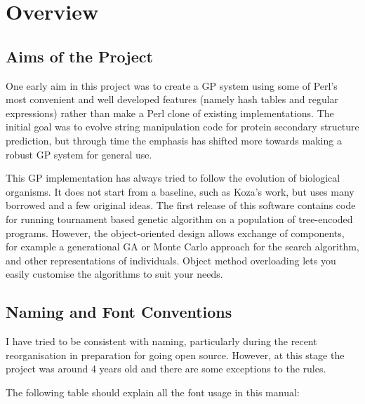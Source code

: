 \documentclass[a4paper]{article}
\begin{document}
\section{Overview}
\subsection{Aims of the Project}
One early aim in this project was to create a GP system using some of
Perl's most convenient and well developed features (namely hash tables
and regular expressions) rather than make a Perl clone of existing
implementations.  The initial goal was to evolve string manipulation
code for protein secondary structure prediction, but through time the
emphasis has shifted more towards making a robust GP system for
general use.

This GP implementation has always tried to follow the evolution of
biological organisms.  It does not start from a baseline, such as
Koza's work, but uses many borrowed and a few original ideas.  The
first release of this software contains code for running tournament
based genetic algorithm on a population of tree-encoded programs.
However, the object-oriented design allows exchange of components, for
example a generational GA or Monte Carlo approach for the search
algorithm, and other representations of individuals.  Object method
overloading lets you easily customise the algorithms to suit your
needs.

\subsection{Naming and Font Conventions}

I have tried to be consistent with naming, particularly during the
recent reorganisation in preparation for going open source.
However, at this stage the project was around 4 years old and there
are some exceptions to the rules.

The following table should explain all the font usage in this manual:
\end{document}
